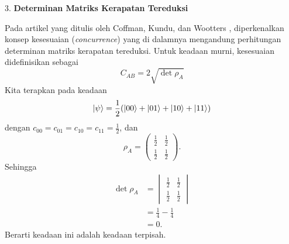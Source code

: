 3. \textbf{Determinan Matriks Kerapatan Tereduksi}
\par
Pada artikel yang ditulis oleh Coffman, Kundu, dan Wootters \cite{wootters1998entanglement}, diperkenalkan konsep kesesuaian (\textit{concurrence}) yang di dalamnya mengandung perhitungan determinan matriks kerapatan tereduksi. Untuk keadaan murni, kesesuaian didefinisikan sebagai
\begin{equation}
	C_{AB}=2\sqrt{\det\rho_{A}}
\end{equation}
Kita terapkan pada keadaan
\begin{equation}
	\ket{\psi}=\frac{1}{2}(\ket{00}+\ket{01}+\ket{10}+\ket{11})
\end{equation}
dengan $c_{00}=c_{01}=c_{10}=c_{11}=\frac{1}{2}$, dan
\begin{equation}
	\rho_{A}=
	\begin{pmatrix}
		\frac{1}{2}&\frac{1}{2}\\
		\frac{1}{2}&\frac{1}{2}
	\end{pmatrix}.
\end{equation}
Sehingga
\begin{equation}
	\begin{aligned}
		\det\rho_{A}
		&=\begin{vmatrix}
			\frac{1}{2}&\frac{1}{2}\\
			\frac{1}{2}&\frac{1}{2}
		\end{vmatrix}\\
		&=\frac{1}{4}-\frac{1}{4}\\
		&=0.
	\end{aligned}
\end{equation}
Berarti keadaan ini adalah keadaan terpisah.


